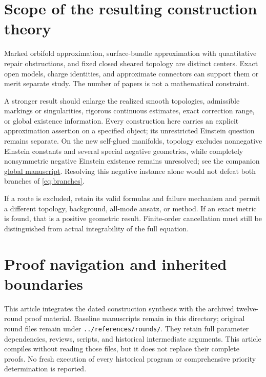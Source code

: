 \documentclass[a4paper,11pt]{article}
\theoremstyle{definition}
\begin{document}
\section{Scope of the resulting construction theory}\label{sec:scope}
Marked orbifold approximation, surface-bundle approximation with
quantitative repair obstructions, and fixed closed sheared topology
are distinct centers. Exact open models, charge identities, and
approximate connectors can support them or merit separate study.
The number of papers is not a mathematical constraint.

A stronger result should enlarge the realized smooth topologies,
admissible markings or singularities, rigorous continuous estimates,
exact correction range, or global existence information.
Every construction here carries an explicit approximation assertion
on a specified object; its unrestricted Einstein question remains
separate. On the new self-glued manifolds, topology excludes
nonnegative Einstein constants and several special negative
geometries, while completely nonsymmetric negative Einstein existence
remains unresolved; see the companion
\href{20260921_global.tex}{global manuscript}.
Resolving this negative instance alone would not defeat both
branches of \eqref{eq:branches}.

If a route is excluded, retain its valid formulas and failure mechanism
and permit a different topology, background, all-mode ansatz, or method.
If an exact metric is found, that is a positive geometric result.
Finite-order cancellation must still be distinguished from actual
integrability of the full equation.

\appendix
\section{Proof navigation and inherited boundaries}\label{app:sources}
This article integrates the dated construction synthesis with the
archived twelve-round proof material. Baseline manuscripts remain in
this directory; original round files remain under
\nolinkurl{../references/rounds/}. They retain full parameter
dependencies, reviews, scripts, and historical intermediate arguments.
This article compiles without reading those files, but it does not
replace their complete proofs. No fresh execution of every historical
program or comprehensive priority determination is reported.
\end{document}
